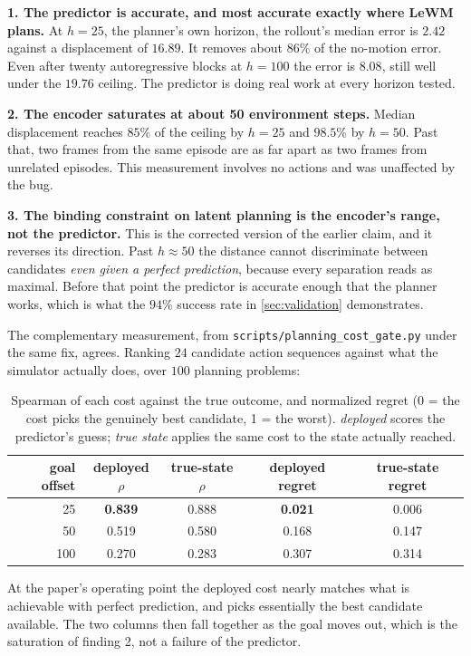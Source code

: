 \documentclass[11pt]{article}
\begin{document}
\textbf{1. The predictor is accurate, and most accurate exactly where LeWM plans.} At
$h{=}25$, the planner's own horizon, the rollout's median error is $2.42$ against a
displacement of $16.89$. It removes about $86\%$ of the no-motion error. Even after twenty
autoregressive blocks at $h{=}100$ the error is $8.08$, still well under the $19.76$ ceiling.
The predictor is doing real work at every horizon tested.

\textbf{2. The encoder saturates at about 50 environment steps.} Median displacement reaches
$85\%$ of the ceiling by $h{=}25$ and $98.5\%$ by $h{=}50$. Past that, two frames from the
same episode are as far apart as two frames from unrelated episodes. This measurement involves
no actions and was unaffected by the bug.

\textbf{3. The binding constraint on latent planning is the encoder's range, not the
predictor.} This is the corrected version of the earlier claim, and it reverses its direction.
Past $h \approx 50$ the distance cannot discriminate between candidates \emph{even given a
perfect prediction}, because every separation reads as maximal. Before that point the
predictor is accurate enough that the planner works, which is what the $94\%$ success rate in
\cref{sec:validation} demonstrates.

The complementary measurement, from \texttt{scripts/planning\_cost\_gate.py} under the same
fix, agrees. Ranking $24$ candidate action sequences against what the simulator actually does,
over $100$ planning problems:

\begin{table}[H]
\centering
\small
\caption{Spearman of each cost against the true outcome, and normalized regret (0 = the cost
picks the genuinely best candidate, 1 = the worst). \emph{deployed} scores the predictor's
guess; \emph{true state} applies the same cost to the state actually reached.}
\begin{tabular}{rcccc}
\toprule
goal offset & deployed $\rho$ & true-state $\rho$ & deployed regret & true-state regret \\
\midrule
25  & \textbf{0.839} & 0.888 & \textbf{0.021} & 0.006 \\
50  & 0.519 & 0.580 & 0.168 & 0.147 \\
100 & 0.270 & 0.283 & 0.307 & 0.314 \\
\bottomrule
\end{tabular}
\end{table}

At the paper's operating point the deployed cost nearly matches what is achievable with
perfect prediction, and picks essentially the best candidate available. The two columns then
fall together as the goal moves out, which is the saturation of finding 2, not a failure of
the predictor.
\end{document}
